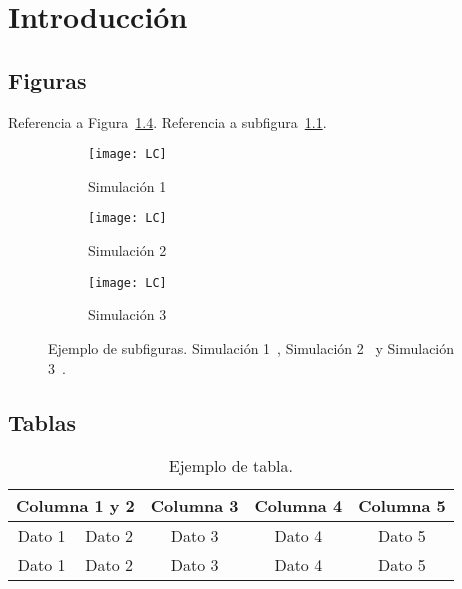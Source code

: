  
\chapter{Introducción}

\section{Figuras}

Referencia a Figura~\ref{fig:simulaciones}. Referencia a subfigura~\ref{fig:sim1}.

\begin{figure}[h!tb]
\centering
\begin{subfigure}[b]{0.45\linewidth}
\texttt{[image: LC]}
\caption{Simulación 1}
\label{fig:sim1}
\end{subfigure}
\begin{subfigure}[b]{0.45\linewidth}
\texttt{[image: LC]}
\caption{Simulación 2}
\label{fig:sim2}
\end{subfigure}

\begin{subfigure}[b]{0.7\linewidth}
\texttt{[image: LC]}
\caption{Simulación 3}
\label{fig:sim3}
\end{subfigure}

\caption{Ejemplo de subfiguras. Simulación 1~, Simulación 2~ y Simulación 3~.}
\label{fig:simulaciones}
\end{figure}

\section{Tablas}

\begin{table}[h!tb]
\centering
\caption{Ejemplo de tabla.}
\label{tab:ejemplo}
\begin{tabular}{ccccc}
\toprule
\multicolumn{2}{c}{Columna 1 y 2} & Columna 3 & Columna 4 & Columna 5 \\
\midrule
	Dato 1 & Dato 2 & Dato 3 & Dato 4 & Dato 5 \\
\cmidrule(r){1-2} \cmidrule(l){3-5}
	Dato 1 & Dato 2 & Dato 3 & Dato 4 & Dato 5 \\
\bottomrule
\end{tabular}
\end{table}


